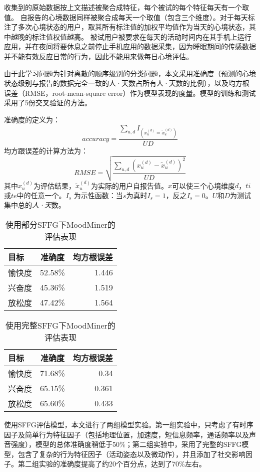 收集到的原始数据按上文描述被聚合成特征，每个被试的每个特征每天有一个取值。
自报告的心境数据同样被聚合成每天一个取值（包含三个维度）。对于每天标注了多次心境状态的用户，取其所有标注值的加权平均值作为当天的心境状态，其中越晚的标注值权值越高。
被试用户被要求在每天的活动时间内在其手机上运行应用，并在夜间将要休息之前停止手机应用的数据采集，因为睡眠期间的传感数据并不能有效反应日常的行为，因此不能用来做每日心境评估。

由于此学习问题为针对离散的顺序级别的分类问题，本文采用准确度（预测的心境状态级别与报告的数据完全一致的人·天数占所有人·天数的比例），以及均方根误差（RMSE，root-mean-square error）作为模型表现的度量。模型的训练和测试采用了5份交叉验证的方法。

准确度的定义为： 
\[ accuracy = \frac{\sum_{u,d}{I_{(x_u^{(d)} = \widetilde{x}_u^{(d)})}}}{UD}
\]
均方跟误差的计算方法为：
\[
RMSE = \sqrt{\frac{\sum_{u,d}{{(x_u^{(d)} - \widetilde{x}_u^{(d)})}^2}}{UD}}
\]
其中$x_u^{(d)}$为评估结果，$\widetilde{x}_u^{(d)}$为实际的用户自报告值。$x$可以使三个心境维度$d$，$ti$或$te$中的任意一个。$I_s$ 为示性函数：当$s$为真时$I_s = 1$，反之$I_s = 0$。$U$和$D$为测试集中总的\textit{人·天}数。 


\begin{table}[htbp]
  \centering
  \caption{使用部分SFFG下MoodMiner的评估表现}
  \label{mood:tab:Performance}
    \begin{tabular}{|l|c|r|}
      \hline
      目标 & 准确度 & 均方根误差 \\
      \hline
      愉快度 & 52.58\% & 1.446 \\
      兴奋度 & 45.36\% & 1.519 \\
      放松度 & 47.42\% & 1.564 \\
      \hline
    \end{tabular}
\end{table}

\begin{table}[htbp]
  \centering
  \caption{使用完整SFFG下MoodMiner的评估表现}
  \label{mood:tab:Performance2}
    \begin{tabular}{|l|c|r|}
      \hline
      目标 & 准确度 & 均方根误差 \\
      \hline
      愉快度 & 71.68\% & 0.34 \\
      兴奋度 & 65.15\% & 0.361 \\
      放松度 & 65.60\% & 0.433 \\
      \hline
    \end{tabular}
\end{table}
使用SFFG评估模型，本文进行了两组模型实验。第一组实验中，只考虑了有时序因子及简单行为特征因子（包括地理位置，加速度，短信息频率，通话频率以及声音强度），模型的总体准确度稍低于50\%；第二组实验中，采用了完整的SFFG模型，包含了复杂的行为特征因子（活动姿态以及微动作），并且添加了社交影响因子。第二组实验的准确度提高了约20个百分点，达到了70\%左右。

